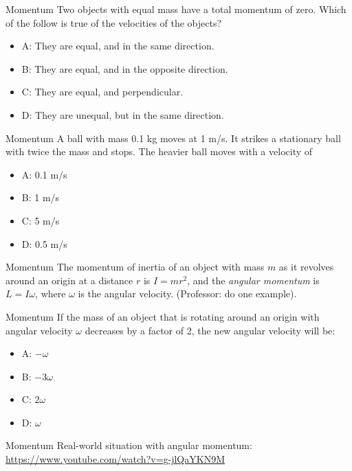 \documentclass{beamer}
\begin{document}
\begin{frame}{Momentum}
Two objects with equal mass have a total momentum of zero.  Which of the follow is true of the velocities of the objects?
\begin{itemize}
\item A: They are equal, and in the same direction.
\item B: They are equal, and in the opposite direction.
\item C: They are equal, and perpendicular.
\item D: They are unequal, but in the same direction.
\end{itemize}
\end{frame}

\begin{frame}{Momentum}
A ball with mass 0.1 kg moves at 1 m/s.  It strikes a stationary ball with twice the mass and stops.  The heavier ball moves with a velocity of
\begin{itemize}
\item A: 0.1 m/s
\item B: 1 m/s
\item C: 5 m/s
\item D: 0.5 m/s
\end{itemize}
\end{frame}

\begin{frame}{Momentum}
The momentum of inertia of an object with mass $m$ as it revolves around an origin at a distance $r$ is $I = mr^2$, and the \textit{angular momentum} is $L = I \omega$, where $\omega$ is the angular velocity. (Professor: do one example).
\end{frame}

\begin{frame}{Momentum}
If the mass of an object that is rotating around an origin with angular velocity $\omega$ decreases by a factor of 2, the new angular velocity will be:
\begin{itemize}
\item A: $-\omega$
\item B: $-3\omega$
\item C: $2\omega$
\item D: $\omega$
\end{itemize}
\end{frame}

\begin{frame}{Momentum}
Real-world situation with angular momentum: \\
\url{https://www.youtube.com/watch?v=g-jlQaYKN9M}
\end{frame}
\end{document}
